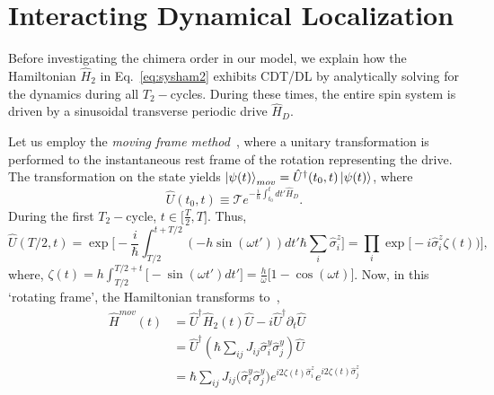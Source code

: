 \documentclass[12pt]{iopart}
\begin{document}
\section{\label{sec:level2} Interacting Dynamical Localization}

Before investigating the chimera order in our model, we explain how the Hamiltonian $\hat{H}_2$ in Eq.~\eqref{eq:sysham2} exhibits CDT/DL by analytically solving for the dynamics during all $T_2-$cycles. During these times,  the entire spin system is driven by a sinusoidal transverse periodic drive $\hat{H}_D$.
	
Let us employ the \textit{moving frame method}~\cite{haldar_dynamical_2021}, where a unitary transformation is performed to the instantaneous rest frame of the rotation representing the drive. The transformation on the state yields $\ket{\psi(t)}_{mov} = \hat{U}^\dagger(t_0,t) \ket{\psi(t)}$, where 
\begin{equation}
    \hat{U}(t_0,t) \equiv \mathcal{T} e^{-\frac{i}{\hbar}\int_{t_0}^{t} dt' \hat{H}_D}.
    \label{eq:rot1}
\end{equation}
During the first $T_2-$cycle, $t \in{\Big[\frac{T}{2}, T \Big]}$. Thus,
\begin{equation}
    \hat{U}\left(T/2,t\right) = \exp \Bigg[-\frac{i}{\hbar}\int_{T/2}^{t+T/2} (-h \sin(\omega t'))dt'\hbar\sum_i\hat{\sigma}^z_i\Bigg]
    = \prod_{i} \exp\Big[-i \hat{\sigma}^z_i\zeta(t))\Big],
\end{equation}
where, $\displaystyle{
    \zeta (t) = h\int_{T/2}^{T/2+t}  \Big[-\sin(\omega t')dt'\Big]=  \frac{h}{\omega}\Big[1-\cos(\omega t)\Big]}$.		
Now, in this `rotating frame', the Hamiltonian transforms to~\cite{haldar_dynamical_2021},
\begin{align}
    \hat{H}^{mov}(t) &= \hat{U}^\dagger \hat{H}_2(t) \hat{U}- i \hat{U}^\dagger \partial_t \hat{U}\nonumber\\
    &= \hat{U}^\dagger \left(\hbar\sum_{ij}J_{ij}\hat{\sigma}^y_i\hat{\sigma}^y_j\right) \hat{U}\nonumber\\
    &=\hbar\sum_{ij} J_{ij} \Big(\hat{\sigma}^y_i\hat{\sigma}^y_j\Big) e^{i 2\zeta(t) \hat{\sigma}^z_i}  e^{i 2\zeta(t) \hat{\sigma}^z_j}
    \label{eq:movham}
\end{align}
	
\end{document}
